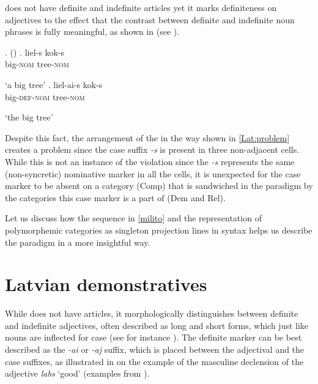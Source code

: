 \noindent {} does not have definite and indefinite articles yet it marks definiteness on adjectives to the effect that the contrast between definite and indefinite noun phrases is fully meaningful, as shown in \Next (see \citealt{Budina1966,Nau1998,Praulins2012}).


\ex.  (\citealt[84]{Lyons1999})\label{conc1}
\ag. liel-s kok-s\\
big-\textsc{nom} tree-\textsc{nom}\\
\strut `a big tree'
\bg. liel-ai-s kok-s\\
big-\textsc{def-nom} tree-\textsc{nom}\\
\strut `the big tree'\label{Lat:koks}

Despite this fact, the arrangement of the   in the way shown  in \ref{Lat:problem}  creates a problem since the case suffix \textit{-s} is present in three non-adjacent cells. While this is not an instance of the  violation since the \textit{-s}  represents the same (non-syncretic) nominative marker in all the cells, it is unexpected for the case marker to be absent on a category (Comp) that is sandwiched in the paradigm by the categories this case marker is a part of (Dem and Rel). 
\par
Let us discuss how the sequence in \ref{milito} and the representation of polymorphemic categories as  singleton projection lines in syntax helps us describe the  paradigm in a more insightful way.

\section{Latvian demonstratives}

\noindent 
While  does not have articles, it morphologically distinguishes between definite and indefinite adjectives, often described as long and short forms, which just like  nouns are inflected for case (see for instance \citealt[57--58]{Mathiassen1997}). The definite marker can be best described as the \textit{-ai} or \textit{-aj} suffix, which is placed between the adjectival  and the case suffixes, as illustrated in  on the example of the masculine declension of the adjective \textit{labs} `good' (examples from \citealt[293--294]{Eckert-etal-1994}). 

